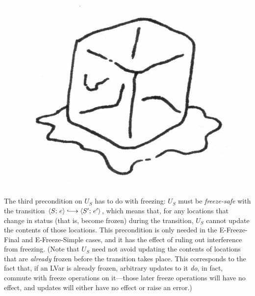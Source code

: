 \DefNonConflictingStoreUpdateOperation

\ifdefined\DISSERTATION
\begin{figure}
\vspace{-1.5em}
\begin{center}
  \includegraphics[scale=0.13]{../illustrations/frozen}
\end{center}
\vspace{-1em}
\end{figure}
\fi

The third precondition on $U_S$ has to do with freezing: $U_S$ must be
\emph{freeze-safe} with the transition $\config{S}{e} \parstepsto
\config{S'}{e'}$, which means that, for any locations that change in
status (that is, become frozen) during the transition, $U_S$ cannot
update the contents of those locations.  This precondition is only
needed in the {\sc E-Freeze-Final} and {\sc E-Freeze-Simple} cases,
and it has the effect of ruling out interference from freezing.  (Note
that $U_S$ need not avoid updating the contents of locations that are
\emph{already} frozen before the transition takes place.  This
corresponds to the fact that, if an LVar is already frozen, arbitrary
updates to it \emph{do}, in fact, commute with freeze operations on
it---those later freeze operations will have no effect, and
updates will either have no effect or raise an error.)

\DefFreezeSafe

